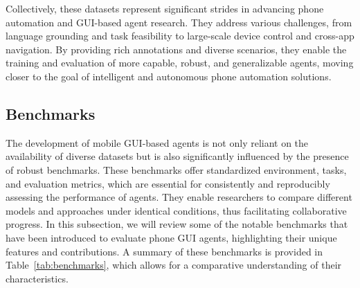 Collectively, these datasets represent significant strides in advancing phone automation and GUI-based agent research. They address various challenges, from language grounding and task feasibility to large-scale device control and cross-app navigation. By providing rich annotations and diverse scenarios, they enable the training and evaluation of more capable, robust, and generalizable agents, moving closer to the goal of intelligent and autonomous phone automation solutions.

\subsection{Benchmarks}
\label{subsec:benchmarks}

The development of mobile GUI-based agents is not only reliant on the availability of diverse datasets but is also significantly influenced by the presence of robust benchmarks. These benchmarks offer standardized environment, tasks, and evaluation metrics, which are essential for consistently and reproducibly assessing the performance of agents. They enable researchers to compare different models and approaches under identical conditions, thus facilitating collaborative progress. In this subsection, we will review some of the notable benchmarks that have been introduced to evaluate phone GUI agents, highlighting their unique features and contributions. A summary of these benchmarks is provided in Table~\ref{tab:benchmarks}, which allows for a comparative understanding of their characteristics.

